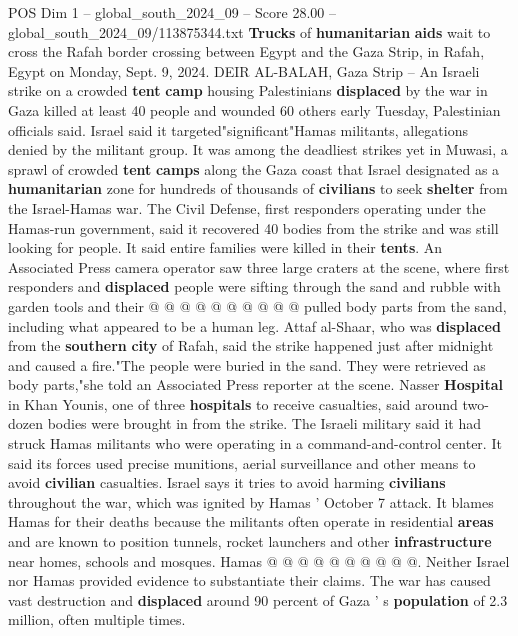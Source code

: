 \begin{textsample}{POS Dim 1 – global\_south\_2024\_09 – Score 28.00 – global\_south\_2024\_09/113875344.txt}  \label{ex:f1_pos_208}
\textbf{Trucks} of \textbf{humanitarian} \textbf{aids} wait to cross the Rafah border crossing between Egypt and the Gaza Strip, in Rafah, Egypt on Monday, Sept. 9, 2024.
DEIR AL-BALAH, Gaza Strip -- An Israeli strike on a crowded \textbf{tent} \textbf{camp} housing Palestinians \textbf{displaced} by the war in Gaza killed at least 40 people and wounded 60 others early Tuesday, Palestinian officials said.
Israel said it targeted"significant"Hamas militants, allegations denied by the militant group.
It was among the deadliest strikes yet in Muwasi, a sprawl of crowded \textbf{tent} \textbf{camps} along the Gaza coast that Israel designated as a \textbf{humanitarian} zone for hundreds of thousands of \textbf{civilians} to seek \textbf{shelter} from the Israel-Hamas war.
The Civil Defense, first responders operating under the Hamas-run government, said it recovered 40 bodies from the strike and was still looking for people.
It said entire families were killed in their \textbf{tents}.
An Associated Press camera operator saw three large craters at the scene, where first responders and \textbf{displaced} people were sifting through the sand and rubble with garden tools and their @ @ @ @ @ @ @ @ @ @ pulled body parts from the sand, including what appeared to be a human leg.
Attaf al-Shaar, who was \textbf{displaced} from the \textbf{southern} \textbf{city} of Rafah, said the strike happened just after midnight and caused a fire."The people were buried in the sand.
They were retrieved as body parts,"she told an Associated Press reporter at the scene.
Nasser \textbf{Hospital} in Khan Younis, one of three \textbf{hospitals} to receive casualties, said around two-dozen bodies were brought in from the strike.
The Israeli military said it had struck Hamas militants who were operating in a command-and-control center.
It said its forces used precise munitions, aerial surveillance and other means to avoid \textbf{civilian} casualties.
Israel says it tries to avoid harming \textbf{civilians} throughout the war, which was ignited by Hamas ' October 7 attack.
It blames Hamas for their deaths because the militants often operate in residential \textbf{areas} and are known to position tunnels, rocket launchers and other \textbf{infrastructure} near homes, schools and mosques.
Hamas @ @ @ @ @ @ @ @ @ @.
Neither Israel nor Hamas provided evidence to substantiate their claims.
The war has caused vast destruction and \textbf{displaced} around 90 percent of Gaza ' s \textbf{population} of 2.3 million, often multiple times.

\end{textsample}
